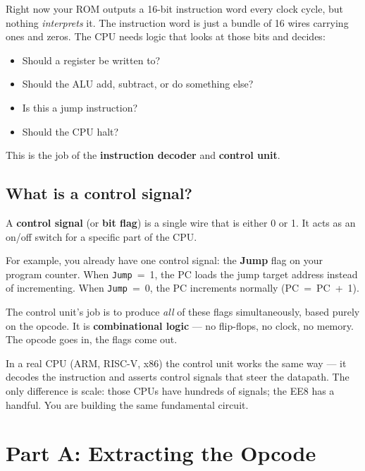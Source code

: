 \documentclass[11pt,a4paper]{article}
\newcommand{\flag}[1]{\texttt{#1}}
\begin{document}
Right now your ROM outputs a 16-bit instruction word every clock cycle, but nothing \emph{interprets} it. The instruction word is just a bundle of 16 wires carrying ones and zeros. The CPU needs logic that looks at those bits and decides:

\begin{itemize}[leftmargin=2em]
  \item Should a register be written to?
  \item Should the ALU add, subtract, or do something else?
  \item Is this a jump instruction?
  \item Should the CPU halt?
\end{itemize}

This is the job of the \textbf{instruction decoder} and \textbf{control unit}.

\subsection{What is a control signal?}

A \textbf{control signal} (or \textbf{bit flag}) is a single wire that is either 0 or 1.
It acts as an on/off switch for a specific part of the CPU.

\medskip
For example, you already have one control signal: the \textbf{Jump} flag on your program counter.
When \flag{Jump}~=~1, the PC loads the jump target address instead of incrementing.
When \flag{Jump}~=~0, the PC increments normally (PC~=~PC~+~1).

\medskip
The control unit's job is to produce \emph{all} of these flags simultaneously, based purely on the opcode. It is \textbf{combinational logic} --- no flip-flops, no clock, no memory. The opcode goes in, the flags come out.

\begin{designnote}
In a real CPU (ARM, RISC-V, x86) the control unit works the same way --- it decodes the instruction and asserts control signals that steer the datapath.
The only difference is scale: those CPUs have hundreds of signals; the EE8 has a handful.
You are building the same fundamental circuit.
\end{designnote}


\section{Part A: Extracting the Opcode}
\end{document}
